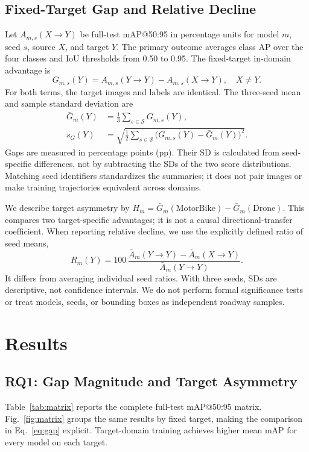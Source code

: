 \documentclass[conference,a4paper]{IEEEtran}
\begin{document}
\subsection{Fixed-Target Gap and Relative Decline}
Let $A_{m,s}(X\!\rightarrow\!Y)$ be full-test mAP@50:95 in percentage units for model $m$, seed $s$, source $X$, and target $Y$. The primary outcome averages class AP over the four classes and IoU thresholds from 0.50 to 0.95. The fixed-target in-domain advantage is
\begin{equation}
G_{m,s}(Y)=A_{m,s}(Y\!\rightarrow\!Y)-A_{m,s}(X\!\rightarrow\!Y),\quad X\ne Y.
\label{eq:gap}
\end{equation}
For both terms, the target images and labels are identical. The three-seed mean and sample standard deviation are
\begin{align}
\bar G_m(Y)&=\frac{1}{3}\sum_{s\in\mathcal S}G_{m,s}(Y),\\
s_G(Y)&=\sqrt{\frac{1}{2}\sum_{s\in\mathcal S}\bigl(G_{m,s}(Y)-\bar G_m(Y)\bigr)^2}.
\end{align}
Gaps are measured in percentage points (pp). Their SD is calculated from seed-specific differences, not by subtracting the SDs of the two score distributions. Matching seed identifiers standardizes the summaries; it does not pair images or make training trajectories equivalent across domains.

We describe target asymmetry by $H_m=\bar G_m(\mathrm{MotorBike})-\bar G_m(\mathrm{Drone})$. This compares two target-specific advantages; it is not a causal directional-transfer coefficient. When reporting relative decline, we use the explicitly defined ratio of seed means,
\begin{equation}
R_m(Y)=100\,\frac{\bar A_m(Y\!\rightarrow\!Y)-\bar A_m(X\!\rightarrow\!Y)}{\bar A_m(Y\!\rightarrow\!Y)}.
\label{eq:relative}
\end{equation}
It differs from averaging individual seed ratios. With three seeds, SDs are descriptive, not confidence intervals. We do not perform formal significance tests or treat models, seeds, or bounding boxes as independent roadway samples.

\section{Results}
\subsection{RQ1: Gap Magnitude and Target Asymmetry}
Table~\ref{tab:matrix} reports the complete full-test mAP@50:95 matrix. Fig.~\ref{fig:matrix} groups the same results by fixed target, making the comparison in Eq.~\eqref{eq:gap} explicit. Target-domain training achieves higher mean mAP for every model on each target.
\end{document}

